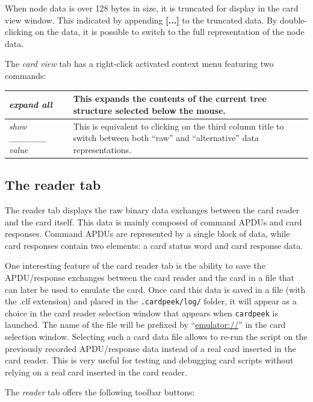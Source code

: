 \documentclass[11pt]{report}
\newcommand{\syn}[1]{\texttt{#1}}
\begin{document}
When node data is over 128 bytes in size, it is truncated for display in the card view window. 
This indicated by appending \textbf{[...]} to the truncated data. By double-clicking on the data, it is possible
to switch to the full representation of the node data.

The \emph{card view} tab has a right-click activated context menu featuring two commands:
\vspace{1em}\noindent
\begin{tabular}{l|p{11cm}}
\hline
\emph{expand all}	& This expands the contents of the current tree structure selected below the mouse. \\
\hline
\emph{show \_\_\_\_\_\_ value} & This is equivalent to clicking on the third column title 
  to switch between both ``raw'' and ``alternative'' data representations. \\
\hline
\end{tabular}
\vspace{2em}



\subsection{The reader tab}

The reader tab displays the raw binary data exchanges between the card reader and the card itself. 
This data is mainly composed of command APDUs and card responses. Command APDUs are represented by a single
block of data, while card responses contain two elements: a card status word and card response data.

One interesting feature of the card reader tab is the ability to save the APDU/response exchanges between the card reader and
the card in a file that can later be used to emulate the card. Once card this data is saved in a file (with the .clf
extension) and placed in the \syn{.cardpeek/log/} folder, it will appear as a choice in the card reader selection
window that appears when \texttt{cardpeek} is launched. The name of the file will be prefixed by 
``\url{emulator://}'' in the card selection window. Selecting such a card data file allows to re-run the script
on the previously recorded APDU/response data instead of a real card inserted in the card reader. This is very useful for
testing and debugging card scripts without relying on a real card inserted in the card reader.

The \emph{reader} tab offers the following toolbar buttons:
\end{document}

